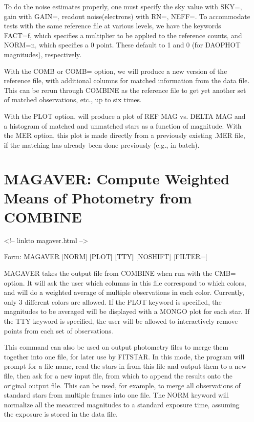 To do the noise estimates properly, one must specify the sky value with
SKY=, gain with GAIN=, readout noise(electrons) with RN=, NEFF=. To
accommodate tests with the same reference file at various levels, we have
the keywords FACT=f, which specifies a multiplier to be applied to the
reference counts, and NORM=n, which specifies a 0 point. These default to 1
and 0 (for DAOPHOT magnitudes), respectively.

With the COMB or COMB= option, we will produce a new version of the
reference file, with additional columns for matched information from the
data file. This can be rerun through COMBINE as the reference file to get
yet another set of matched observations, etc., up to six times.

With the PLOT option, will produce a plot of REF MAG vs. DELTA MAG and a
histogram of matched and unmatched stars as a function of magnitude. With
the MER option, this plot is made directly from a previously existing .MER
file, if the matching has already been done previously (e.g., in batch).

\section{MAGAVER: Compute Weighted Means of Photometry from COMBINE}
\begin{rawhtml}
<!-- linkto magaver.html -->
\end{rawhtml}
\begin{command}
  \item[Form: MAGAVER {[NORM]} {[PLOT]} {[TTY]} {[NOSHIFT]} {[FILTER=]}\hfill]{}
\end{command}

MAGAVER takes the output file from COMBINE when run with the CMB=
option. It will ask the user which columns in this file correspond to which
colors, and will do a weighted average of multiple observations in each
color. Currently, only 3 different colors are allowed.  If the PLOT keyword
is specified, the magnitudes to be averaged will be displayed with a MONGO
plot for each star. If the TTY keyword is specified, the user will be
allowed to interactively remove points from each set of observations.

This command can also be used on output photometry files to merge them
together into one file, for later use by FITSTAR.  In this mode, the
program will prompt for a file name, read the stars in from this file and
output them to a new file, then ask for a new input file, from which to
append the results onto the original output file. This can be used, for
example, to merge all observations of standard stars from multiple frames
into one file.  The NORM keyword will normalize all the measured magnitudes
to a standard exposure time, assuming the exposure is stored in the data
file.

